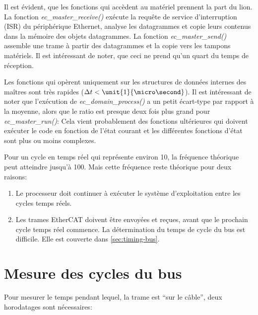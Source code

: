 \documentclass[a4paper,12pt,BCOR6mm,bibtotoc,idxtotoc]{scrbook}
\begin{document}
Il est \'evident, que les fonctions qui acc\`edent au mat\'eriel
prennent la part du lion.  La fonction \textit{ec\_master\_receive()}
ex\'ecute la requ\^ete de service d'interruption (ISR) du p\'eriph\'erique
Ethernet, analyse les datagrammes et copie leurs contenus dans la
m\'emoire des objets datagrammes.  La fonction
\textit{ec\_master\_send()} assemble une trame \`a partir des
datagrammes et la copie vers les tampons mat\'eriels.  Il est
int\'eressant de noter, que ceci ne prend qu'un quart du temps de
r\'eception.

Les fonctions qui op\`erent uniquement sur les structures de donn\'ees
internes des ma\^itres sont tr\`es rapides ($\Delta t <
\unit{1}{\micro\second}$).  Il est int\'eressant de noter que
l'ex\'ecution de \textit{ec\_domain\_process()} a un petit \'ecart-type
par rapport \`a la moyenne, alors que le ratio est presque deux fois
plus grand pour \textit{ec\_master\_run()}: Cela vient probablement
des fonctions ult\'erieures qui doivent ex\'ecuter le code en fonction de
l'\'etat courant et les diff\'erentes fonctions d'\'etat sont plus ou moins
complexes.

Pour un cycle en temps r\'eel qui repr\'esente environ
\unit{10}{\micro\second}, la fr\'equence th\'eorique peut atteindre
jusqu'\`a \unit{100}{\kilo\hertz}.  Mais cette fr\'equence reste th\'eorique
pour deux raisons:

\begin{enumerate}

\item Le processeur doit continuer \`a ex\'ecuter le syst\`eme d'exploitation
  entre les cycles temps r\'eels.

\item Les trames EtherCAT doivent \^etre envoy\'ees et re\c{c}ues, avant que
  le prochain cycle temps r\'eel commence. La d\'etermination du temps de
  cycle du bus est difficile. Elle est couverte dans
  \autoref{sec:timing-bus}.

\end{enumerate}


\section{Mesure des cycles du bus}
\label{sec:timing-bus}

Pour mesurer le temps pendant lequel, la trame est ``sur le c\^able'',
deux horodatages sont n\'ecessaires:
\end{document}
